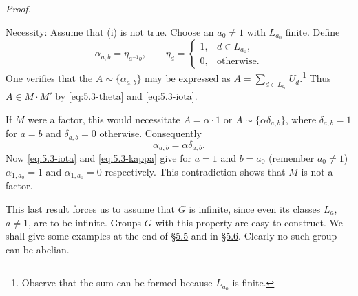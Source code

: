 \documentclass[b5paper,twoside]{article}
\newcommand{\secref}[2]{\hyperref[#1]{\mbox{\S#2}}}
\theoremstyle{mvnplain}
\renewenvironment{proof}[1][Proof]{%
  \par\addvspace{0.35\baselineskip}%
  \noindent\textit{#1.}\ \normalfont\ignorespaces
}{%
  \par\addvspace{0.35\baselineskip}%
}
\newcommand{\M}{\mathbf M}
\def\M{M}%
\def\mathfrak#1{#1}%
\begin{document}
\begin{proof}
Necessity: Assume that (i) is not true. Choose an \(a_0\ne1\) with
\(\mathfrak L_{a_0}\) finite. Define
\begin{equation}\tag{5.3.\(\iota\)}\label{eq:5.3-iota}
 \alpha_{a,b}=\eta_{a^{-1}b},\qquad
 \eta_d=\begin{cases}1,&d\in\mathfrak L_{a_0},\\0,&\text{otherwise}.
 \end{cases}
\end{equation}
One verifies that the \(A\sim\{\alpha_{a,b}\}\) may be expressed as
\(A=\sum_{d\in\mathfrak L_{a_0}}U_d\).\footnote{Observe that the sum can
be formed because \(\mathfrak L_{a_0}\) is finite.} Thus
\(A\in\M\cdot\M'\) by \eqref{eq:5.3-theta} and \eqref{eq:5.3-iota}.

If \(\M\) were a factor, this would necessitate \(A=\alpha\cdot1\) or
\(A\sim\{\alpha\delta_{a,b}\}\), where \(\delta_{a,b}=1\) for \(a=b\)
and \(\delta_{a,b}=0\) otherwise. Consequently
\begin{equation}\tag{5.3.\(\kappa\)}\label{eq:5.3-kappa}
 \alpha_{a,b}=\alpha\delta_{a,b}.
\end{equation}
Now \eqref{eq:5.3-iota} and \eqref{eq:5.3-kappa} give for \(a=1\) and
\(b=a_0\) (remember \(a_0\ne1\)) \(\alpha_{1,a_0}=1\) and
\(\alpha_{1,a_0}=0\) respectively. This contradiction shows that \(\M\) is
not a factor.
\end{proof}

This last result forces us to assume that \(\mathfrak G\) is infinite, since
even its classes \(\mathfrak L_a\), \(a\ne1\), are to be infinite. Groups
\(\mathfrak G\) with this property are easy to construct. We shall give some
examples at the end of \secref{sec:5.5}{5.5} and in
\secref{sec:5.6}{5.6}. Clearly no such group can be abelian.
\end{document}
